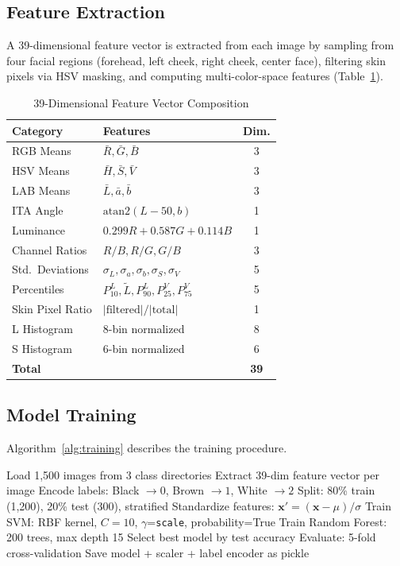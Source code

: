 \documentclass[conference]{IEEEtran}
\begin{document}
\subsection{Feature Extraction}

A 39-dimensional feature vector is extracted from each image by sampling from four facial regions (forehead, left cheek, right cheek, center face), filtering skin pixels via HSV masking, and computing multi-color-space features (Table~\ref{tab:features}).

\begin{table}[t]
\centering
\caption{39-Dimensional Feature Vector Composition}
\label{tab:features}
\begin{tabular}{llc}
\toprule
\textbf{Category} & \textbf{Features} & \textbf{Dim.} \\
\midrule
RGB Means & $\bar{R}, \bar{G}, \bar{B}$ & 3 \\
HSV Means & $\bar{H}, \bar{S}, \bar{V}$ & 3 \\
LAB Means & $\bar{L}, \bar{a}, \bar{b}$ & 3 \\
ITA Angle & $\text{atan2}(L-50, b)$ & 1 \\
Luminance & $0.299R + 0.587G + 0.114B$ & 1 \\
Channel Ratios & $R/B, R/G, G/B$ & 3 \\
Std.\ Deviations & $\sigma_L, \sigma_a, \sigma_b, \sigma_S, \sigma_V$ & 5 \\
Percentiles & $P_{10}^L, \tilde{L}, P_{90}^L, P_{25}^V, P_{75}^V$ & 5 \\
Skin Pixel Ratio & $|\text{filtered}| / |\text{total}|$ & 1 \\
L Histogram & 8-bin normalized & 8 \\
S Histogram & 6-bin normalized & 6 \\
\midrule
\textbf{Total} & & \textbf{39} \\
\bottomrule
\end{tabular}
\end{table}

\subsection{Model Training}

Algorithm~\ref{alg:training} describes the training procedure.

\begin{algorithm}[t]
\caption{Skin Tone Model Training Pipeline}
\label{alg:training}
\begin{algorithmic}[1]
\STATE Load 1,500 images from 3 class directories
\STATE Extract 39-dim feature vector per image
\STATE Encode labels: Black $\rightarrow 0$, Brown $\rightarrow 1$, White $\rightarrow 2$
\STATE Split: 80\% train (1,200), 20\% test (300), stratified
\STATE Standardize features: $\mathbf{x}' = (\mathbf{x} - \mu) / \sigma$
\STATE Train SVM: RBF kernel, $C=10$, $\gamma$=\texttt{scale}, probability=True
\STATE Train Random Forest: 200 trees, max depth 15
\STATE Select best model by test accuracy
\STATE Evaluate: 5-fold cross-validation
\STATE Save model + scaler + label encoder as pickle
\end{algorithmic}
\end{algorithm}
\end{document}
